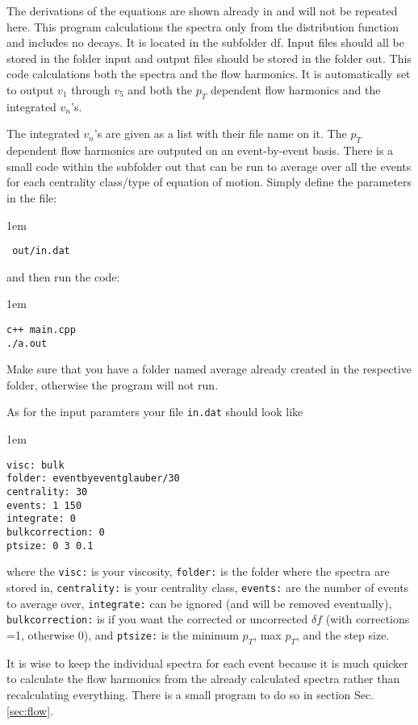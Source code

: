 \documentclass[article]{revtex4-1}
\newcommand{\code}[1]{\bigskip\noindent\begin{addmargin}[3em]{1em}\begin{linenumbers}\texttt{#1}\end{linenumbers}\end{addmargin}\bigskip}
\newcommand{\nocode}[1]{\texttt{#1}}
\begin{document}
The derivations of the equations are shown already in \cite{code} and will not be repeated here.  This program calculations the spectra only from the distribution function and includes no decays.  It is located in the subfolder df. Input files should all be stored in the folder input and output files should be stored in the folder out.   This code calculations both the spectra and the flow harmonics.  It is automatically set to output $v_1$ through $v_5$ and both the $p_T$ dependent flow harmonics and the integrated $v_n$'s. 

The integrated $v_n$'s are given as a list with their file name on it.  The $p_T$ dependent flow harmonics are outputed on an event-by-event basis.  There is a small code within the subfolder out that can be run to average over all the events for each centrality class/type of equation of motion.  Simply define the parameters in the file:

\code{ out/in.dat}

and then run the code:

\code{c++ main.cpp\\
./a.out}

Make sure that you have a folder named average already created in the respective folder, otherwise the program will not run.

As for the input paramters your file \nocode{in.dat} should look like

\code{visc: bulk\\
folder: eventbyevent\textunderscore glauber/30\\
centrality: 30\\
events: 1 150\\
integrate: 0\\
bulkcorrection: 0\\
ptsize: 0 3 0.1}
where the \nocode{visc:} is your viscosity, \nocode{folder:} is the folder where the spectra are stored in, \nocode{centrality:} is your centrality class, \nocode{events:} are the number of events to average over, \nocode{integrate:} can be ignored (and will be removed eventually), \nocode{bulkcorrection:} is if you want the corrected or uncorrected $\delta f$ (with corrections =1, otherwise 0), and \nocode{ptsize:} is the minimum $p_T$, max $p_T$, and the step size.
 
It is wise to keep the individual spectra for each event because it is much quicker to calculate the flow harmonics from the already calculated spectra rather than recalculating everything.  There is a small program to do so in section Sec. \ref{sec:flow}.
\end{document}
